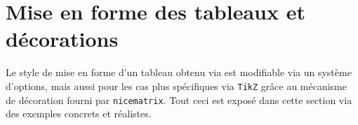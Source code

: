 \documentclass[10pt, a4paper]{article}
\begin{document}
\section{Mise en forme des tableaux et décorations}

Le style de mise en forme d'un tableau obtenu via  est modifiable via un système d'options, mais aussi pour les cas plus spécifiques via \verb#TikZ# grâce au mécanisme de décoration fourni par \verb#nicematrix#. Tout ceci est exposé dans cette section via des exemples concrets et réalistes.
\end{document}
